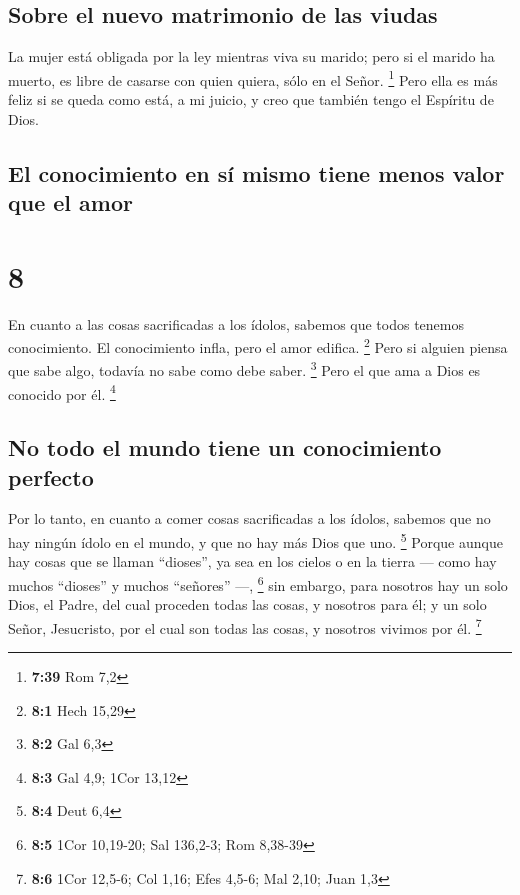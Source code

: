 \hypertarget{sobre-el-nuevo-matrimonio-de-las-viudas}{%
\subsection{Sobre el nuevo matrimonio de las
viudas}\label{sobre-el-nuevo-matrimonio-de-las-viudas}}

 La mujer está obligada por la ley mientras viva su
marido; pero si el marido ha muerto, es libre de casarse con quien
quiera, sólo en el Señor. \footnote{\textbf{7:39} Rom 7,2}
 Pero ella es más feliz si se queda como está, a mi
juicio, y creo que también tengo el Espíritu de Dios.

\hypertarget{el-conocimiento-en-suxed-mismo-tiene-menos-valor-que-el-amor}{%
\subsection{El conocimiento en sí mismo tiene menos valor que el
amor}\label{el-conocimiento-en-suxed-mismo-tiene-menos-valor-que-el-amor}}

\hypertarget{section-7}{%
\section{8}\label{section-7}}

 En cuanto a las cosas sacrificadas a los ídolos, sabemos
que todos tenemos conocimiento. El conocimiento infla, pero el amor
edifica. \footnote{\textbf{8:1} Hech 15,29}  Pero si
alguien piensa que sabe algo, todavía no sabe como debe saber.
\footnote{\textbf{8:2} Gal 6,3}  Pero el que ama a Dios es
conocido por él. \footnote{\textbf{8:3} Gal 4,9; 1Cor 13,12}

\hypertarget{no-todo-el-mundo-tiene-un-conocimiento-perfecto}{%
\subsection{No todo el mundo tiene un conocimiento
perfecto}\label{no-todo-el-mundo-tiene-un-conocimiento-perfecto}}

 Por lo tanto, en cuanto a comer cosas sacrificadas a los
ídolos, sabemos que no hay ningún ídolo en el mundo, y que no hay más
Dios que uno. \footnote{\textbf{8:4} Deut 6,4}  Porque
aunque hay cosas que se llaman ``dioses'', ya sea en los cielos o en la
tierra --- como hay muchos ``dioses'' y muchos ``señores'' ---,
\footnote{\textbf{8:5} 1Cor 10,19-20; Sal 136,2-3; Rom 8,38-39}
 sin embargo, para nosotros hay un solo Dios, el Padre,
del cual proceden todas las cosas, y nosotros para él; y un solo Señor,
Jesucristo, por el cual son todas las cosas, y nosotros vivimos por él.
\footnote{\textbf{8:6} 1Cor 12,5-6; Col 1,16; Efes 4,5-6; Mal 2,10; Juan
  1,3}

